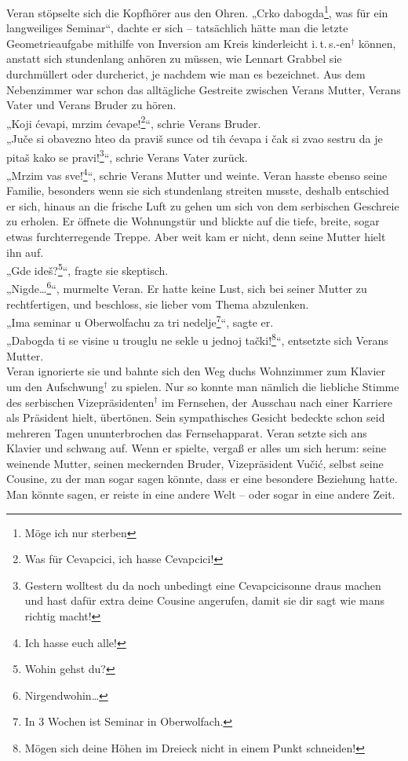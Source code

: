 \documentclass[oneside]{memoir}
\begin{document}
\noindent Veran stöpselte sich die Kopfhörer aus den Ohren. „Crko dabogda\footnote{Möge ich nur sterben}, was für ein langweiliges Seminar“, dachte er sich -- tatsächlich hätte man die letzte Geometrieaufgabe mithilfe von Inversion am Kreis kinderleicht i.\,t.\,s.-en$^{\dagger}$ können, anstatt sich stundenlang anhören zu müssen, wie Lennart Grabbel sie durchmüllert oder durcherict, je nachdem wie man es bezeichnet. Aus dem Nebenzimmer war schon das alltägliche Gestreite zwischen Verans Mutter, Verans Vater und Verans Bruder zu hören. \\
„Koji ćevapi, mrzim ćevape!\footnote{Was für Cevapcici, ich hasse Cevapcici!}“, schrie Verans Bruder. \\
„Juče si obavezno hteo da praviš sunce od tih ćevapa i čak si zvao sestru da je pitaš kako se pravi!\footnote{Gestern wolltest du da noch unbedingt eine Cevapcicisonne draus machen und hast dafür extra deine Cousine angerufen, damit sie dir sagt wie mans richtig macht!}“, schrie Verans Vater zurück. \\
„Mrzim vas sve!\footnote{Ich hasse euch alle!}“, schrie Verans Mutter und weinte. Veran hasste ebenso seine Familie, besonders wenn sie sich stundenlang streiten musste, deshalb entschied er sich, hinaus an die frische Luft zu gehen um sich von dem serbischen Geschreie zu erholen. Er öffnete die Wohnungstür und blickte auf die tiefe, breite, sogar etwas furchterregende Treppe. Aber weit kam er nicht, denn seine Mutter hielt ihn auf. \\
„Gde ideš?\footnote{Wohin gehst du?}“, fragte sie skeptisch. \\
„Nigde\ldots\footnote{Nirgendwohin\ldots}“, murmelte Veran. Er hatte keine Lust, sich bei seiner Mutter zu rechtfertigen, und beschloss, sie lieber vom Thema abzulenken. \\
„Ima seminar u Oberwolfachu za tri nedelje\footnote{In 3 Wochen ist Seminar in Oberwolfach.}“, sagte er. \\
„Dabogda ti se visine u trouglu ne sekle u jednoj tački!\footnote{Mögen sich deine Höhen im Dreieck nicht in einem Punkt schneiden!}“, entsetzte sich Verans Mutter. \\
Veran ignorierte sie und bahnte sich den Weg duchs Wohnzimmer zum Klavier um den Aufschwung$^{\dagger}$ zu spielen. Nur so konnte man nämlich die liebliche Stimme des serbischen Vizepräsidenten$^{\dagger}$ im Fernsehen, der Ausschau nach einer Karriere als Präsident hielt, übertönen. Sein sympathisches Gesicht bedeckte schon seid mehreren Tagen ununterbrochen das Fernsehapparat. Veran setzte sich ans Klavier und schwang auf. Wenn er spielte, vergaß er alles um sich herum: seine weinende Mutter, seinen meckernden Bruder, Vizepräsident Vučić, selbst seine Cousine, zu der man sogar sagen könnte, dass er eine besondere Beziehung hatte. Man könnte sagen, er reiste in eine andere Welt -- oder sogar in eine andere Zeit.
\end{document}
